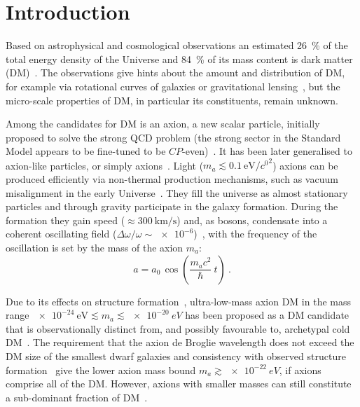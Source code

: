 \chapter{Introduction}
\label{ch:axions-intro}

Based on astrophysical and cosmological observations an estimated \SI{26}{\percent} of the total energy density of the Universe and \SI{84}{\percent} of its mass content is dark matter (DM)~\cite{Planck2015}.
The observations give hints about the amount and distribution of DM, for example via rotational curves of galaxies or gravitational lensing~\cite{ApJ1990}, but the micro-scale properties of DM, in particular its constituents, remain unknown.

Among the candidates for DM is an axion, a new scalar particle, initially proposed to solve the strong QCD problem (the strong sector in the Standard Model appears to be fine-tuned to be $CP$-even)~\cite{PhysRevLett.38.1440,PQ1977B,Weinberg1978,Wilczek1978,Kim1979,Zakharov1980,Zhitnitsky1980B,Srednicki1981}. 
It has been later generalised to axion-like particles, or simply axions~\cite{Witten1984,Conlon2006,Witten2006,Arvanitaki2010,Arias2012,Marsh2015Review}.
Light ($m_a \lesssim \SI[per-mode=symbol]{0.1}{\electronvolt\per\clight\squared}$) axions can be produced efficiently via non-thermal production mechanisms, such as vacuum misalignment in the early Universe~\cite{Preskill1983cosmo,Sikivie1983cosmo,Dine1983cosmo}.
They fill the universe as almost stationary particles and through gravity participate in the galaxy formation. During the formation they gain speed ($\approx \SI[per-mode=symbol]{300}{\kilo\metre\per\second}$) and, as bosons, condensate into a coherent oscillating field ($\Delta\omega / \omega \sim \num{e-6}$)~\cite{Marsh2015Review}, with the frequency of the oscillation is set by the mass of the axion $m_a$:
\begin{equation}
  a = a_0 \, \cos\left(\frac{ m_a c^2 }{\hbar} \ t\right) \ .
\end{equation}

Due to its effects on structure formation~\cite{Khlopov1985}, ultra-low-mass axion DM in the mass range $\SI{e-24}{\electronvolt} \lesssim m_a \lesssim \SI{e-20}{eV}$ has been proposed as a DM candidate that is observationally distinct from, and possibly favourable to, archetypal cold DM~\cite{Hu2000,Marsh2014,Schive2014,Marsh2015Review,Hui2017}.
The requirement that the axion de Broglie wavelength does not exceed the DM size of the smallest dwarf galaxies and consistency with observed structure formation~\cite{Marsh2015B,Schive2015,Marsh2017} give the lower axion mass bound $m_a \gtrsim \SI{e-22}{eV}$, if axions comprise all of the DM\@. However, axions with smaller masses can still constitute a sub-dominant fraction of DM~\cite{Hlozek15}.

